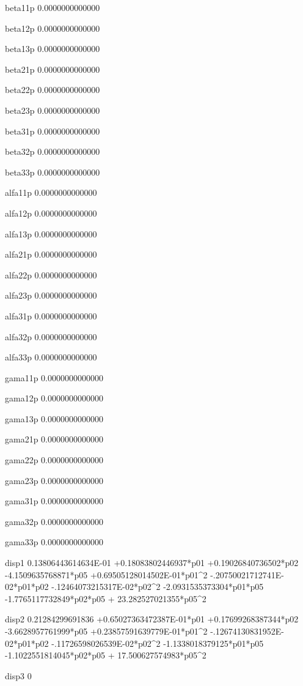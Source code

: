  beta11p
   0.0000000000000 
  
 beta12p
   0.0000000000000 
  
 beta13p
   0.0000000000000 
  
 beta21p
   0.0000000000000 
  
 beta22p
   0.0000000000000 
  
 beta23p
   0.0000000000000 
  
 beta31p
   0.0000000000000 
  
 beta32p
   0.0000000000000 
  
 beta33p
   0.0000000000000 
  
 alfa11p
   0.0000000000000 
  
 alfa12p
   0.0000000000000 
  
 alfa13p
   0.0000000000000 
  
 alfa21p
   0.0000000000000 
  
 alfa22p
   0.0000000000000 
  
 alfa23p
   0.0000000000000 
  
 alfa31p
   0.0000000000000 
  
 alfa32p
   0.0000000000000 
  
 alfa33p
   0.0000000000000 
  
 gama11p
   0.0000000000000 
  
 gama12p
   0.0000000000000 
  
 gama13p
   0.0000000000000 
  
 gama21p
   0.0000000000000 
  
 gama22p
   0.0000000000000 
  
 gama23p
   0.0000000000000 
  
 gama31p
   0.0000000000000 
  
 gama32p
   0.0000000000000 
  
 gama33p
   0.0000000000000 
  
 disp1  
  0.13806443614634E-01 +0.18083802446937*p01 +0.19026840736502*p02  -4.1509635768871*p05 +0.69505128014502E-01*p01^2  -.20750021712741E-02*p01*p02  -.12464073215317E-02*p02^2  -2.0931535373304*p01*p05  -1.7765117732849*p02*p05 + 23.282527021355*p05^2 
  
 disp2  
  0.21284299691836 +0.65027363472387E-01*p01 +0.17699268387344*p02  -3.6628957761999*p05 +0.23857591639779E-01*p01^2  -.12674130831952E-02*p01*p02  -.11726598026539E-02*p02^2  -1.1338018379125*p01*p05  -1.1022551814045*p02*p05 + 17.500627574983*p05^2 
  
 disp3  
 0 
  
